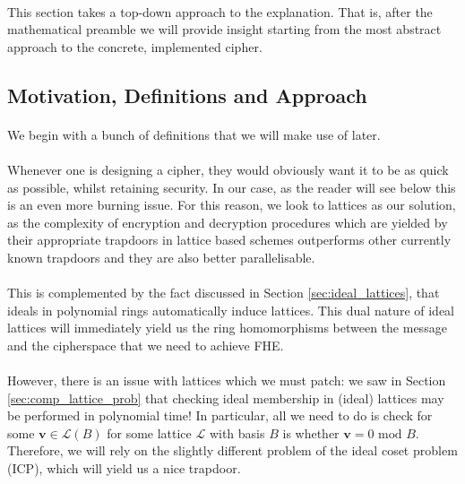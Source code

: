 \documentclass{article}
\theoremstyle{definition}
\theoremstyle{example}
\renewcommand{\L}{\mathcal{L}}
\renewcommand{\mod}{\,\,\text{mod}\,\,}
\renewcommand{\vec}[1]{\mathbf{#1}}
\begin{document}
\paragraph{}
This section takes a top-down approach to the explanation. That is, after the mathematical
preamble we will provide insight starting from the most abstract approach to the
concrete, implemented cipher. 
\subsection{Motivation, Definitions and Approach}
\label{sec:fhe_motivation}
\paragraph{}
We begin with a bunch of definitions that we will make use of later.
\paragraph{} Whenever one is designing a cipher, they would obviously want it to
be as quick as possible, whilst retaining security. In our case, as the reader
will see below this is an even more burning issue. For this reason, we look to
lattices as our solution, as the complexity of encryption and decryption
procedures which are yielded by their appropriate trapdoors in lattice based
schemes outperforms other currently known trapdoors and they are also better
parallelisable.
\paragraph{} This is complemented by the fact discussed in Section
\ref{sec:ideal_lattices}, that ideals in polynomial rings automatically
induce lattices. This dual nature of ideal lattices will immediately yield us
the ring homomorphisms between the message and the cipherspace that we need to
achieve FHE.
\paragraph{} However, there is an issue with lattices which we must patch: we
saw in Section \ref{sec:comp_lattice_prob} that checking ideal membership in
(ideal) lattices may be performed in polynomial time! In particular, all we need
to do is check for some $\vec{v} \in \L(B)$ for some lattice $\L$ with basis $B$
is whether $\vec{v} = 0 \mod B$. Therefore, we will rely on the slightly
different problem of the ideal coset problem (ICP), which will yield us a nice trapdoor.
\end{document}

